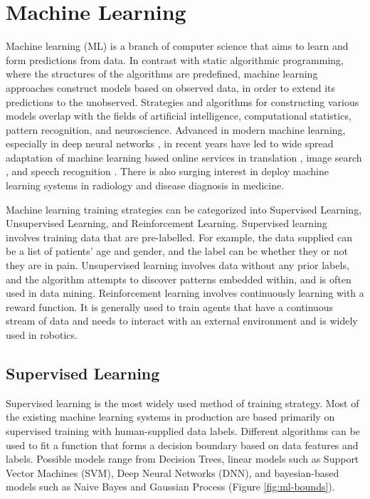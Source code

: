 \section{Machine Learning}
Machine learning (ML) is a branch of computer science that aims to learn and form predictions from data. In contrast with static algorithmic programming, where the structures of the algorithms are predefined, machine learning approaches construct models based on observed data, in order to extend its predictions to the unobserved. Strategies and algorithms for constructing various models overlap with the fields of artificial intelligence, computational statistics, pattern recognition, and neuroscience. Advanced in modern machine learning, especially in deep neural networks \cite{LeCun2015}, in recent years have led to wide spread adaptation of machine learning based online services in translation \cite{Bahdanau2014a}, image search \cite{simonyan2014very}, and speech recognition \cite{graves2013speech}. There is also surging interest in deploy machine learning systems in radiology and disease diagnosis in medicine\cite{Kamnitsas2016,Suk2014}.

Machine learning training strategies can be categorized into Supervised Learning, Unsupervised Learning, and Reinforcement Learning. Supervised learning involves training data that are pre-labelled. For example, the data supplied can be a list of patients' age and gender, and the label can be whether they or not they are in pain. Unsupervised learning involves data without any prior labels, and the algorithm attempts to discover patterns embedded within, and is often used in data mining. Reinforcement learning involves continuously learning with a reward function. It is generally used to train agents that have a continuous stream of data and needs to interact with an external environment and is widely used in robotics.

\subsection{Supervised Learning}
Supervised learning is the most widely used method of training strategy. Most of the existing machine learning systems in production are based primarily on supervised training with human-supplied data labels. Different algorithms can be used to fit a function that forms a decision boundary based on data features and labels. Possible models range from Decision Trees, linear models such as Support Vector Machines (SVM), Deep Neural Networks (DNN), and bayesian-based models such as Naive Bayes and Gaussian Process (Figure \ref{fig:ml-bounds}).

